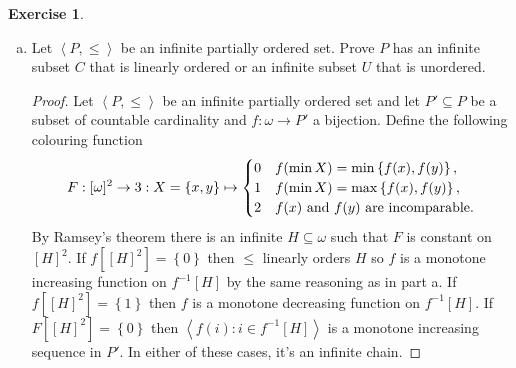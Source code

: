 \documentclass{article}
\theoremstyle{definition}
\newtheorem{question}{Exercise}
\newcommand{\set}[1]{\left\{#1\right\}}
\newcommand{\sequence}[2]{\left<#1:#2\right>}
\newcommand{\restrict}{\upharpoonright}
\DeclarePairedDelimiter{\abs}{|}{|}
\begin{document}
\begin{question}
\begin{enumerate}[a.]
              \begin{proof}
                  Let \(s\) be a bounded sequence and consider the following
                  function:
                  \[
                      F:[\omega]^{2}\to 2:X=\set{x,y}\mapsto\begin{cases}
                          0 & s_{\min X}=\min\set{s_{x},s_{y}}, \\
                          1 & s_{\min X}=\max\set{s_{x},s_{y}}.
                      \end{cases}
                  \]
                  Then by Ramsey's theorem there is a subset
                  \(H\subseteq\omega\) with \(\abs{H}=\aleph_{0}\) and \(F\)
                  constant on \([H]^{2}\subseteq[\omega]^{2}\). This means that
                  \(s\restrict_{H}\) must be monotone (weakly)
                  increasing/decreasing.

                  Bounded monotone sequences converge, and a subsequence of a
                  bounded sequence is bounded so \(s\restrict H\) must converge.
              \end{proof}

        \item Let \(\left<P,\leq\right>\) be an infinite partially ordered set.
              Prove \(P\) has an infinite subset \(C\) that is linearly ordered
              or an infinite subset \(U\) that is unordered.

              \begin{proof}
                  Let \(\left<P,\leq\right>\) be an infinite partially ordered
                  set and let \(P'\subseteq P\) be a subset of countable
                  cardinality and \(f:\omega\to P'\) a bijection. Define the
                  following colouring function
                  \[
                      F:[\omega]^{2}\to 3:X=\set{x,y}\mapsto\begin{cases}
                          0 & f(\min X)=\min\set{f(x),f(y)},                       \\
                          1 & f(\min X)=\max\set{f(x),f(y)},                       \\
                          2 & \textnormal{\(f(x)\) and \(f(y)\) are incomparable}.
                      \end{cases}
                  \]
                  By Ramsey's theorem there is an infinite \(H\subseteq\omega\)
                  such that \(F\) is constant on \([H]^{2}\). If
                  \(f[[H]^{2}]=\set{0}\) then \(\leq\) linearly orders \(H\) so
                  \(f\) is a monotone increasing function on \(f^{-1}[H]\) by
                  the same reasoning as in part a. If \(f[[H]^{2}]=\set{1}\)
                  then \(f\) is a monotone decreasing function on \(f^{-1}[H]\).
                  If \(F[[H]^{2}]=\set{0}\) then \(\sequence{f(i)}{i\in
                      f^{-1}[H]}\) is a monotone increasing sequence in \(P'\). In
                  either of these cases, it's an infinite chain.


\end{proof}
\end{enumerate}
\end{question}
\end{document}
